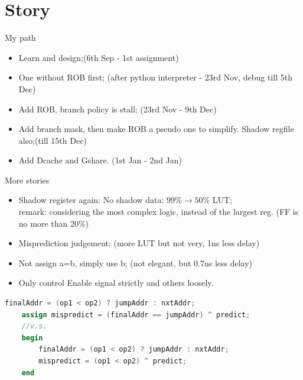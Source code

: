 \documentclass{beamer}
\begin{document}
\section{Story}
\begin{frame}{My path}
    \begin{itemize}
        \item Learn and design;(6th Sep - 1st assignment)
        \item One without ROB first; 
        (after python interpreter - 23rd Nov, debug till 5th Dec)
        \item Add ROB, branch policy is stall; (23rd Nov - 9th Dec)
        \item Add branch mask, then make ROB a pseudo one to simplify. 
        Shadow regfile also;(till 15th Dec) 
        \item Add Dcache and Gshare. (1st Jan - 2nd Jan)
    \end{itemize}
\end{frame}

\begin{frame}[containsverbatim]{More stories}
    \begin{itemize}
        \item Shadow register again: No shadow data: $99\%\rightarrow50\%$ LUT; \\
        remark: considering the most complex logic, instead of the largest reg. (FF is no more than 20\%)
        \item Misprediction judgement; (more LUT but not very, 1ns less delay)
        \item Not assign a=b, simply use b; (not elegant, but 0.7ns less delay)
        \item Only control Enable signal strictly and others loosely. 
    \end{itemize}
\begin{lstlisting}[language=Verilog,
    keywordstyle=\color{blue!70}, 
    commentstyle=\color{red!50!green!50!blue!50}, 
    basicstyle=\footnotesize\consolas] 
    finalAddr = (op1 < op2) ? jumpAddr : nxtAddr;
    assign mispredict = (finalAddr == jumpAddr) ^ predict;
    //v.s.
    begin
        finalAddr = (op1 < op2) ? jumpAddr : nxtAddr;
        mispredict = (op1 < op2) ^ predict;
    end
\end{lstlisting}
\end{frame}
\end{document}
